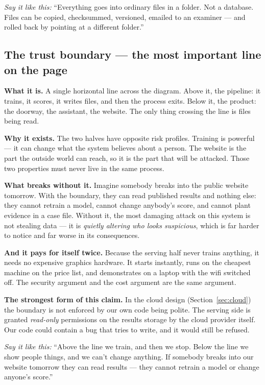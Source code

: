 \documentclass[11pt,a4paper]{article}
\newcommand{\aloud}[1]{\par\smallskip\noindent\textit{\textcolor{accent}{Say
it like this:}} ``#1''\par\smallskip}
\begin{document}
\aloud{Everything goes into ordinary files in a folder. Not a database. Files
can be copied, checksummed, versioned, emailed to an examiner --- and rolled
back by pointing at a different folder.}

\subsection{The trust boundary --- the most important line on the page}

\textbf{What it is.} A single horizontal line across the diagram. Above it, the
pipeline: it trains, it scores, it writes files, and then the process exits.
Below it, the product: the doorway, the assistant, the website. The only thing
crossing the line is files being read.

\textbf{Why it exists.} The two halves have opposite risk profiles. Training is
powerful --- it can change what the system believes about a person. The website
is the part the outside world can reach, so it is the part that will be
attacked. Those two properties must never live in the same process.

\textbf{What breaks without it.} Imagine somebody breaks into the public
website tomorrow. With the boundary, they can read published results and
nothing else: they cannot retrain a model, cannot change anybody's score, and
cannot plant evidence in a case file. Without it, the most damaging attack on
this system is not stealing data --- it is \emph{quietly altering who looks
suspicious}, which is far harder to notice and far worse in its consequences.

\textbf{And it pays for itself twice.} Because the serving half never trains
anything, it needs no expensive graphics hardware. It starts instantly, runs on
the cheapest machine on the price list, and demonstrates on a laptop with the
wifi switched off. The security argument and the cost argument are the same
argument.

\begin{keybox}
\textbf{The strongest form of this claim.} In the cloud design
(Section~\ref{sec:cloud}) the boundary is not enforced by our own code being
polite. The serving side is granted \emph{read-only} permissions on the
results storage by the cloud provider itself. Our code could contain a bug that
tries to write, and it would still be refused.
\end{keybox}

\aloud{Above the line we train, and then we stop. Below the line we show people
things, and we can't change anything. If somebody breaks into our website
tomorrow they can read results --- they cannot retrain a model or change
anyone's score.}
\end{document}
